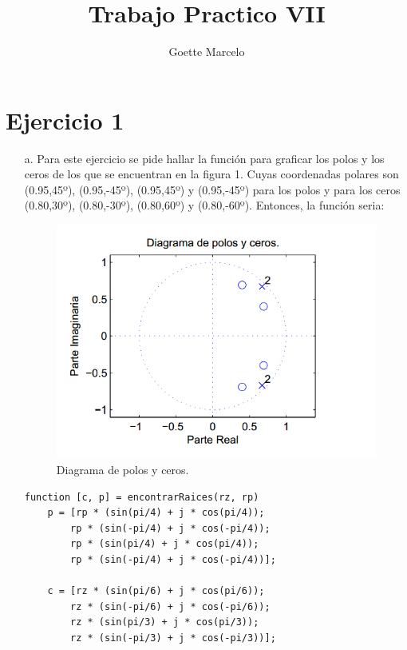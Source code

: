 \documentclass[10pt,a4paper,final]{article}
\author{Goette Marcelo}
\title{Trabajo Practico VII}
\begin{document}
\maketitle

\section{Ejercicio 1}
\begin{itemize}
\item[a.] Para este ejercicio se pide hallar la función para graficar los polos y los ceros de los que se encuentran en la figura 1. Cuyas coordenadas polares son (0.95,45º), (0.95,-45º), (0.95,45º) y (0.95,-45º) para los polos y para los ceros (0.80,30º), (0.80,-30º), (0.80,60º) y (0.80,-60º). Entonces, la función seria:

\begin{figure}[h!]
\centering
  \caption{Diagrama de polos y ceros.}
  \label{fig:pyc}
  \includegraphics[scale=0.7]{fig1.png}
    
\end{figure}

\begin{lstlisting}
function [c, p] = encontrarRaices(rz, rp)
    p = [rp * (sin(pi/4) + j * cos(pi/4));
        rp * (sin(-pi/4) + j * cos(-pi/4));
        rp * (sin(pi/4) + j * cos(pi/4));
        rp * (sin(-pi/4) + j * cos(-pi/4))];
    
    c = [rz * (sin(pi/6) + j * cos(pi/6));
        rz * (sin(-pi/6) + j * cos(-pi/6));
        rz * (sin(pi/3) + j * cos(pi/3));
        rz * (sin(-pi/3) + j * cos(-pi/3))];


\end{lstlisting}
\end{itemize}
\end{document}
